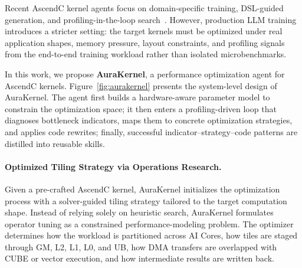 
Recent AscendC kernel agents focus on domain-specific training, DSL-guided generation, and profiling-in-the-loop search~\citep{ascendkernelgen2026,ascendcraft2026,wu2025ascendoptimizer}. However, production LLM training introduces a stricter setting: the target kernels must be optimized under real application shapes, memory pressure, layout constraints, and profiling signals from the end-to-end training workload rather than isolated microbenchmarks. 

In this work, we propose \textbf{AuraKernel}, a performance optimization agent for AscendC kernels.  Figure~\ref{fig:aurakernel} presents the system-level design of AuraKernel. 
The agent first builds a hardware-aware parameter model to constrain the optimization space; it then enters a profiling-driven loop that diagnoses bottleneck indicators, maps them to concrete optimization strategies, and applies code rewrites; finally, successful indicator--strategy--code patterns are distilled into reusable skills. 

\paragraph{Optimized Tiling Strategy via Operations Research.}
Given a pre-crafted AscendC kernel, AuraKernel initializes the optimization process with a solver-guided tiling strategy tailored to the target computation shape. Instead of relying solely on heuristic search, AuraKernel formulates operator tuning as a constrained performance-modeling problem. The optimizer determines how the workload is partitioned across AI Cores, how tiles are staged through GM, L2, L1, L0, and UB, how DMA transfers are overlapped with CUBE or vector execution, and how intermediate results are written back.

